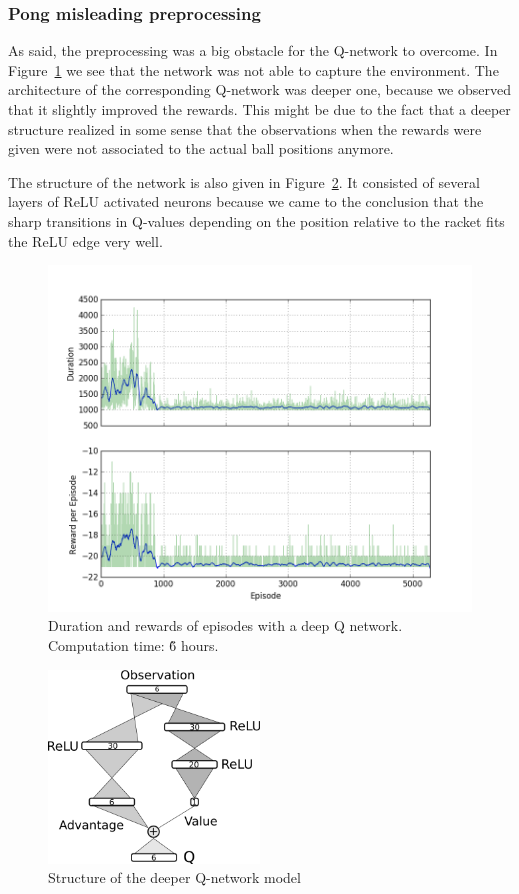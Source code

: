 \documentclass[10pt,a4paper]{article}
\begin{document}
\FloatBarrier
\subsubsection{Pong misleading preprocessing}
As said, the preprocessing was a big obstacle for the Q-network to overcome. In Figure~\ref{fig:deepq_pong_duration} we see that the network was not able to capture the environment. The architecture of the corresponding Q-network was deeper one, because we observed that it slightly improved the rewards. This might be due to the fact that a deeper structure realized in some sense that the observations when the rewards were given were not associated to the actual ball positions anymore.

The structure of the network is also given in Figure~\ref{fig:deepq_relu_structure}. It consisted of several layers of ReLU activated neurons because we came to the conclusion that the sharp transitions in Q-values depending on the position relative to the racket fits the ReLU edge very well.

\begin{figure}[!ht]
  \centering
  \includegraphics[width=1\textwidth]{./figures/long_trial.png}
  \caption{Duration and rewards of episodes with a deep Q network. Computation time: \~6 hours.}
  \label{fig:deepq_pong_duration}
\end{figure}

\begin{figure}[!ht]
  \centering
  \includegraphics[width=0.5\textwidth]{./figures/deep_relu.png}
  \caption{Structure of the deeper Q-network model}
  \label{fig:deepq_relu_structure}
\end{figure}
\end{document}
